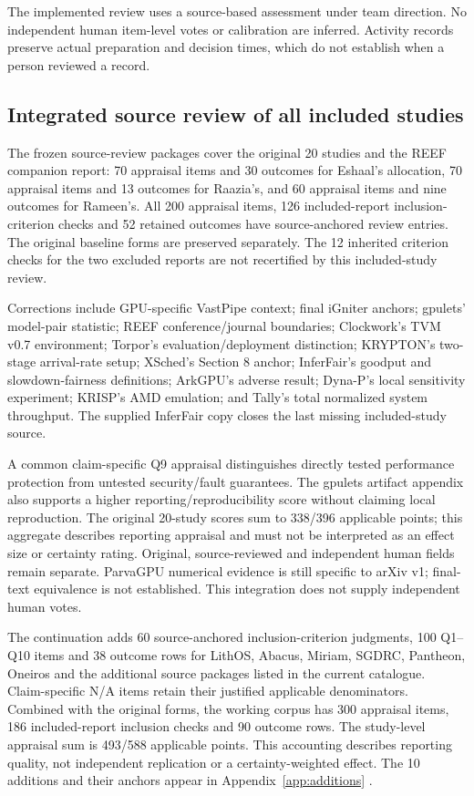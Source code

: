 The implemented review uses a source-based assessment under team direction. No independent human item-level votes or calibration are inferred. Activity records preserve actual preparation and decision times, which do not establish when a person reviewed a record.

\subsection{Integrated source review of all included studies}
The frozen source-review packages cover the original 20 studies and the REEF companion report: 70 appraisal items and 30 outcomes for Eshaal's allocation, 70 appraisal items and 13 outcomes for Raazia's, and 60 appraisal items and nine outcomes for Rameen's. All 200 appraisal items, 126 included-report inclusion-criterion checks and 52 retained outcomes have source-anchored review entries. The original baseline forms are preserved separately. The 12 inherited criterion checks for the two excluded reports are not recertified by this included-study review.

Corrections include GPU-specific VastPipe context; final iGniter anchors; gpulets' model-pair statistic; REEF conference/journal boundaries; Clockwork's TVM v0.7 environment; Torpor's evaluation/deployment distinction; KRYPTON's two-stage arrival-rate setup; XSched's Section 8 anchor; InferFair's goodput and slowdown-fairness definitions; ArkGPU's adverse result; Dyna-P's local sensitivity experiment; KRISP's AMD emulation; and Tally's total normalized system throughput. The supplied InferFair copy closes the last missing included-study source.

A common claim-specific Q9 appraisal distinguishes directly tested performance protection from untested security/fault guarantees. The gpulets artifact appendix also supports a higher reporting/reproducibility score without claiming local reproduction. The original 20-study scores sum to 338/396 applicable points; this aggregate describes reporting appraisal and must not be interpreted as an effect size or certainty rating. Original, source-reviewed and independent human fields remain separate. ParvaGPU numerical evidence is still specific to arXiv v1; final-text equivalence is not established. This integration does not supply independent human votes.

The continuation adds 60 source-anchored inclusion-criterion judgments, 100 Q1--Q10 items and 38 outcome rows for LithOS, Abacus, Miriam, SGDRC, Pantheon, Oneiros and the additional source packages listed in the current catalogue. Claim-specific N/A items retain their justified applicable denominators. Combined with the original forms, the working corpus has 300 appraisal items, 186 included-report inclusion checks and 90 outcome rows. The study-level appraisal sum is 493/588 applicable points. This accounting describes reporting quality, not independent replication or a certainty-weighted effect. The 10 additions and their anchors appear in Appendix~\ref{app:additions} \cite{s021,s022,s023,s024,s025,s026}.

